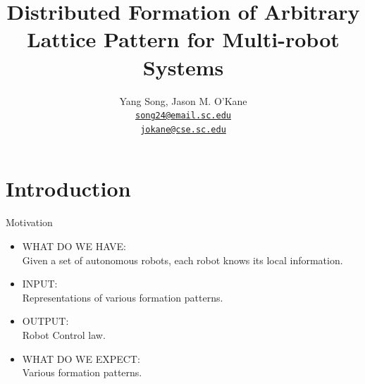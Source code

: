 \documentclass[10pt]{beamer}
\title{Distributed Formation of Arbitrary Lattice Pattern for
  Multi-robot Systems}
\author{
  Yang Song, Jason M. O'Kane\\
  \href{mailto:song24@email.sc.edu}{{\tt song24@email.sc.edu} \\
  \href{mailto:jokane@cse.sc.edu}{\tt jokane@cse.sc.edu}}
}
\institute[
  Dept.\ of Computer Science and Engineering\\
  University of South Carolina
] %
{%
  Dept. of Computer Science and Engineering\\
  University of South Carolina
  
}
\begin{document}
\begin{frame}[plain] %
  \titlepage
\end{frame}


\section{Introduction}
\begin{frame}{Motivation}{}
\begin{block}{}
  \begin{itemize}
  \item {\textcolor{scred}{\large WHAT DO WE HAVE:}}\\
    Given a set of autonomous robots, each robot knows its local information.
  \item {\textcolor{scred}{\large INPUT:}}\\
    Representations of various formation patterns.
  \item {\textcolor{scred}{\large OUTPUT:}}\\
    Robot Control law.
  \item {\textcolor{scred}{\large WHAT DO WE EXPECT:}}\\
    Various formation patterns.
  \end{itemize}
\end{block}
\end{frame}



\end{document}
